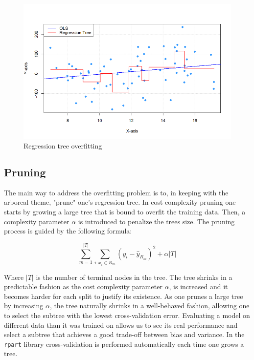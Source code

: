 \documentclass[12pt]{article}
\begin{document}
\begin{figure}
    \centering
    \includegraphics[scale=0.50]{image.png}
    \caption{Regression tree overfitting}
    \label{overfitting_tree}
\end{figure}


\subsection{Pruning}

The main way to address the overfitting problem is to, in keeping with the arboreal theme, "prune" one's regression tree. In cost complexity pruning one starts by growing a large tree that is bound to overfit the training data. Then, a complexity parameter $\alpha$ is introduced to penalize the trees size. The pruning process is guided by the following formula:

\begin{equation}
    \sum_{m=1}^{|T|} \sum_{i: x_i \in R_m} (y_i - \hat{y}_{R_m})^2 + \alpha|T|
\end{equation}

Where $|T|$ is the number of terminal nodes in the tree. The tree shrinks in a predictable fashion as the cost complexity parameter $\alpha$, is increased and it becomes harder for each split to justify its existence. As one prunes a large tree by increasing $\alpha$, the tree naturally shrinks in a well-behaved fashion, allowing one to select the subtree with the lowest cross-validation error. Evaluating a model on different data than it was trained on allows us to see its real performance and select a subtree that achieves a good trade-off between bias and variance. In the \texttt{rpart} library cross-validation is performed automatically each time one grows a tree.
\end{document}
